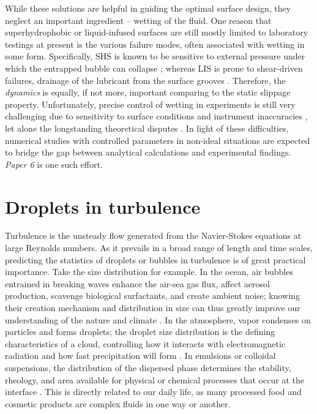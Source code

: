 While these solutions are helpful in guiding the optimal surface design, they neglect an important ingredient -- wetting of the fluid.
One reason that superhydrophobic or liquid-infused surfaces are still mostly limited to laboratory testings at present is the various failure modes, often associated with wetting in some form.
Specifically, SHS is known to be sensitive to external pressure under which the entrapped bubble can collapse \citep{Bocquet}; whereas LIS is prone to shear-driven failures, \ie drainage of the lubricant from the surface grooves \citep{Wexler}.
Therefore, the \emph{dynamics} is equally, if not more, important comparing to the static slippage property.
Unfortunately, precise control of wetting in experiments is still very challenging due to sensitivity to surface conditions and instrument inaccuracies \citep{Liu_vuckovac_etal_2019}, let alone the longstanding theoretical disputes \citep{deGennes_wetting}.
In light of these difficulties, numerical studies with controlled parameters in non-ideal situations are expected to bridge the gap between analytical calculations and experimental findings.
\emph{Paper 6} is one such effort.


\section{Droplets in turbulence}

Turbulence is the unsteady flow generated from the Navier-Stokes equations at large Reynolds numbers.
As it prevails in a broad range of length and time scales, predicting the statistics of droplets or bubbles in turbulence is of great practical importance.
Take the size distribution for example.
In the ocean, air bubbles entrained in breaking waves enhance the air-sea gas flux, affect aerosol production, scavenge biological surfactants, and create ambient noise; knowing their creation mechanism and distribution in size can thus greatly improve our understanding of the nature and climate \citep{deane_stokes_2002a}.
In the atmosphere, vapor condenses on particles and forms droplets; the droplet size distribution is the defining characteristics of a cloud, controlling how it interacts with electromagnetic radiation and how fast precipitation will form \citep{Shaw_2003}.
In emulsions or colloidal suspensions, the distribution of the dispersed phase determines the stability, rheology, and area available for physical or chemical processes that occur at the interface \citep{boxall_etal_2012}. This is directly related to our daily life, as many processed food and cosmetic products are complex fluids in one way or another.

